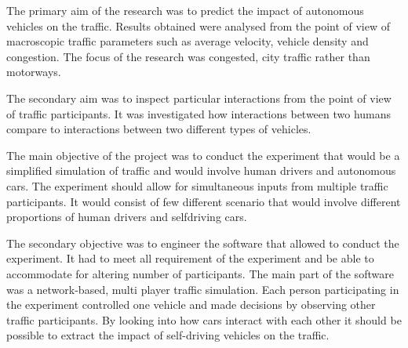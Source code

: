 \documentclass[11pt,english]{article}
\begin{document}


\par
The primary aim of the research was to predict the impact of autonomous vehicles on the traffic. Results obtained were analysed from the point of view of macroscopic traffic parameters such as average velocity, vehicle density and congestion. The focus of the research was congested, city traffic rather than motorways.

\par

The secondary aim was to inspect particular interactions from the point of view of traffic participants. It was investigated how interactions between two humans compare to interactions between two different types of vehicles.  


\par

The main objective of the project was to conduct the experiment that would be a simplified simulation of traffic and would involve human drivers and autonomous cars. The experiment should allow for simultaneous inputs from multiple traffic participants. It would consist of few different scenario that would involve different proportions of human drivers and selfdriving cars. 

\par

The secondary objective was to engineer the software that allowed to conduct the experiment. It had to meet all requirement of the experiment and be able to accommodate for altering number of participants. The main part of the software was a network-based, multi player traffic simulation. Each person participating in the experiment controlled one vehicle and made decisions by observing other traffic participants. By looking into how cars interact with each other it should be possible to extract the impact of self-driving vehicles on the traffic.
\end{document}
